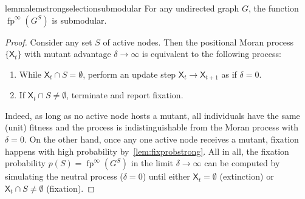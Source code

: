 \documentclass[letterpaper]{article}
\newcommand{\X}{\mathsf{X}}
\newcommand{\fp}{\operatorname{fp}}
\newcommand{\FitAdv}{\delta}
\begin{document}
\begin{restatable}[Submodularity]{lemma}{lemstrongselectionsubmodular}
\label{lem:strong_selection_submodular}
For any undirected graph $G$, the function $\fp^\infty(G^S)$ is submodular.
\end{restatable}
\begin{proof}
Consider any set $S$ of active nodes.
Then the positional Moran process $\{\X_t\}$ with mutant advantage $\FitAdv\to\infty$ is equivalent to the following process:
\begin{enumerate}
\item While $\X_t\cap S=\emptyset$, perform an update step $\X_t\to\X_{t+1}$ as if $\FitAdv=0$.
\item If $\X_t\cap S\ne \emptyset$, terminate and report fixation.
\end{enumerate}
Indeed, as long as no active node hosts a mutant, all individuals have the same (unit) fitness and
the process is indistinguishable from the Moran process with $\FitAdv=0$.
On the other hand, once any one active node receives a mutant, fixation happens with high probability by~\cref{lem:fixprobstrong}.
All in all, the fixation probability $p(S)=\fp^{\infty}(G^S)$ in the limit $\FitAdv\to\infty$
can be computed by simulating the neutral process ($\FitAdv=0$) until
either $\X_t=\emptyset$ (extinction) or $\X_t\cap S\ne\emptyset$ (fixation).


\end{proof}
\end{document}
